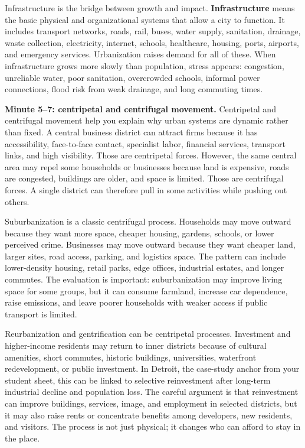 \documentclass[11pt,a4paper]{article}
\newcommand{\term}[1]{\textcolor{HeadingBlue}{\textbf{#1}}}
\begin{document}
Infrastructure is the bridge between growth and impact. \term{Infrastructure}
means the basic physical and organizational systems that allow a city to
function. It includes transport networks, roads, rail, buses, water supply,
sanitation, drainage, waste collection, electricity, internet, schools,
healthcare, housing, ports, airports, and emergency services. Urbanization
raises demand for all of these. When infrastructure grows more slowly than
population, stress appears: congestion, unreliable water, poor sanitation,
overcrowded schools, informal power connections, flood risk from weak drainage,
and long commuting times.

\textbf{Minute 5--7: centripetal and centrifugal movement.}
Centripetal and centrifugal movement help you explain why urban systems are
dynamic rather than fixed. A central business district can attract firms
because it has accessibility, face-to-face contact, specialist labor, financial
services, transport links, and high visibility. Those are centripetal forces.
However, the same central area may repel some households or businesses because
land is expensive, roads are congested, buildings are older, and space is
limited. Those are centrifugal forces. A single district can therefore pull in
some activities while pushing out others.

Suburbanization is a classic centrifugal process. Households may move outward
because they want more space, cheaper housing, gardens, schools, or lower
perceived crime. Businesses may move outward because they want cheaper land,
larger sites, road access, parking, and logistics space. The pattern can include
lower-density housing, retail parks, edge offices, industrial estates, and
longer commutes. The evaluation is important: suburbanization may improve living
space for some groups, but it can consume farmland, increase car dependence,
raise emissions, and leave poorer households with weaker access if public
transport is limited.

Reurbanization and gentrification can be centripetal processes. Investment and
higher-income residents may return to inner districts because of cultural
amenities, short commutes, historic buildings, universities, waterfront
redevelopment, or public investment. In Detroit, the case-study anchor from your
student sheet, this can be linked to selective reinvestment after long-term
industrial decline and population loss. The careful argument is that
reinvestment can improve buildings, services, image, and employment in selected
districts, but it may also raise rents or concentrate benefits among developers,
new residents, and visitors. The process is not just physical; it changes who
can afford to stay in the place.
\end{document}
